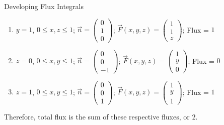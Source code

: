 \documentclass[8pt]{extarticle}
\begin{document}
\begin{problem}{Developing Flux Integrals}
\begin{enumerate}[(1)]
      \item $y = 1$, $0\leq x,z\leq 1$; $\vec{n} = \begin{pmatrix}0\\1\\0\end{pmatrix}$; $\vec{F}(x,y,z) = \begin{pmatrix}1\\1\\z\end{pmatrix}$; Flux = $1$
      \item $z = 0$, $0\leq x,y\leq 1$; $\vec{n} = \begin{pmatrix}0\\0\\-1\end{pmatrix}$; $\vec{F}(x,y,z) = \begin{pmatrix}1\\y\\0\end{pmatrix}$; Flux = $0$
      \item $z = 1$, $0\leq x,y\leq 1$; $\vec{n} = \begin{pmatrix}0\\0\\1\end{pmatrix}$; $\vec{F}(x,y,z) = \begin{pmatrix}1\\y\\1\end{pmatrix}$; Flux = $1$
    \end{enumerate}
    Therefore, total flux is the sum of these respective fluxes, or $2$.
  \end{problem}
\end{document}
